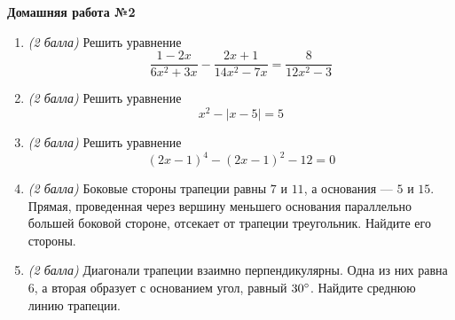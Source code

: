 \documentclass[12pt, a4paper]{article}
\begin{document}
   \cfoot{}
\begin{center}
	\Large
	\textbf{Домашняя работа №2}
\end{center}
\begin{enumerate}
	\item \textit{(2 балла)} Решить уравнение \[ \dfrac{1-2x}{6x^2+3x}-\dfrac{2x+1}{14x^2-7x}=\dfrac{8}{12x^2-3} \]
	\item \textit{(2 балла)} Решить уравнение \[ x^2-|x-5|=5 \]
	\item \textit{(2 балла)} Решить уравнение \[ (2x-1)^4-(2x-1)^2-12=0 \]
	\item \textit{(2 балла)} Боковые стороны трапеции равны \( 7 \) и \( 11 \), а основания --- \( 5 \) и \( 15 \). Прямая, проведенная через вершину меньшего
	основания параллельно большей боковой стороне, отсекает от трапеции треугольник. Найдите его стороны.
	\item \textit{(2 балла)} Диагонали трапеции взаимно перпендикулярны. Одна из них равна \( 6 \), а вторая образует с основанием угол, равный \( 30\degree \). Найдите среднюю линию трапеции.
\end{enumerate}
\end{document}
